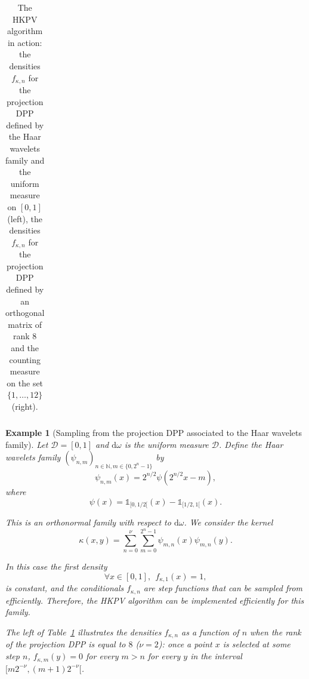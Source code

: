 \documentclass[twoside,11pt]{book}
\newtheorem{example}{Example}
\numberwithin{theorem}{chapter}
\numberwithin{definition}{chapter}
\numberwithin{proposition}{chapter}
\numberwithin{corollary}{chapter}
\numberwithin{example}{chapter}
\numberwithin{lemma}{chapter}
\numberwithin{assumption}{chapter}
\numberwithin{equation}{chapter}
\numberwithin{figure}{chapter}
\begin{document}
\begin{table}[]
\begin{tabular}{| c| c| c|}
\hline
\end{tabular}
\caption{The HKPV algorithm in action: the densities $f_{\kappa,n}$ for the projection DPP defined by the Haar wavelets family and the uniform measure on $[0,1]$(left), the densities $f_{\kappa,n}$ for the projection DPP defined by an orthogonal matrix of rank $8$ and the counting measure on the set $\{ 1, \dots, 12 \}$ (right).\label{table:HKPV_figures}}
\end{table}



\begin{example}[Sampling from the projection DPP associated to the Haar wavelets family]

Let $\mathcal{D} = [0,1]$ and $\mathrm{d}\omega$ is the uniform measure $\mathcal{D}$. Define the Haar wavelets family $(\psi_{n,m})_{n \in \mathbb{N}, m \in \{0,2^{n}-1\}}$ by
\begin{equation}
\psi_{n,m}(x) = 2^{n/2}\psi(2^{n/2}x - m),
\end{equation}
where
\begin{equation}
\psi(x) = \mathbb{1}_{[0,1/2[}(x) - \mathbb{1}_{[1/2,1[}(x).
\end{equation}

This is an orthonormal family with respect to $\mathrm{d}\omega$. We consider the kernel
\begin{equation}
\kappa(x,y) = \sum\limits_{n = 0}^{\nu}\sum\limits_{m=0}^{2^n-1} \psi_{m,n}(x)\psi_{m,n}(y).
\end{equation}

In this case the first density 
\begin{equation}
\forall x \in [0,1], \:\:f_{\kappa,1}(x) = 1,
\end{equation}
is constant, and the conditionals $f_{\kappa,n}$ are step functions that can be sampled from efficiently. Therefore, the HKPV algorithm can be implemented efficiently for this family.


The left of Table~\ref{table:HKPV_figures} illustrates the  densities $f_{\kappa,n}$ as a function of $n$ when the rank of the projection DPP is equal to $8$ ($\nu = 2$): once a point $x$ is selected at some step $n$, $f_{\kappa,m}(y) = 0$ for every $m>n$ for every $y$ in the interval $[m2^{-\nu},(m+1)2^{-\nu}[$.

 \end{example}
\end{document}
